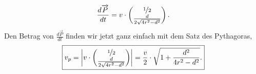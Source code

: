 \begin{Answer}[ref = circlemove]
\begin{equation}
		\frac{d\overrightarrow{P}}{dt} = v\cdot \begin{pmatrix}
		\nicefrac{1}{2}\\
		\frac{d}{2\sqrt{4r^2-d^2}}
		\end{pmatrix}.
	\end{equation}
	Den Betrag von $\frac{d\overrightarrow{P}}{dt}$ finden wir jetzt ganz einfach mit dem Satz des Pythagoras,
	\begin{equation}
	\boxed{
		v_p = \left|v\cdot \begin{pmatrix}
		\nicefrac{1}{2}\\
		\frac{d}{2\sqrt{4r^2-d^2}}
		\end{pmatrix}\right| = \frac{v}{2} \cdot \sqrt{1+\frac{d^2}{4r^2-d^2}}.}
	\end{equation}
	
\end{Answer}